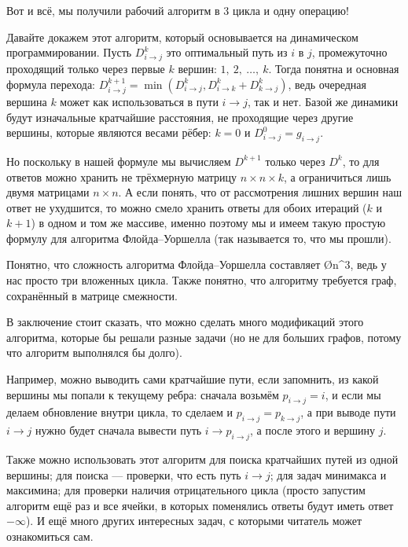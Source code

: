 Вот и всё, мы получили рабочий алгоритм в 3 цикла и одну операцию!

Давайте докажем этот алгоритм, который основывается на динамическом программировании. Пусть $D_{i \to j}^k$ это оптимальный путь из $i$ в $j$, промежуточно проходящий только через первые $k$ вершин: $1,\ 2,\ \ldots,\ k$. Тогда понятна и основная формула перехода: $D_{i \to j}^{k + 1} = \min( D_{i \to j}^k, D_{i \to k}^k + D_{k \to j}^{k})$, ведь очередная вершина $k$ может как использоваться в пути $i \to j$, так и нет. Базой же динамики будут изначальные кратчайшие расстояния, не проходящие через другие вершины, которые являются весами рёбер: $k = 0$ и $D_{i \to j}^0 = g_{i \to j}$.

Но поскольку в нашей формуле мы вычисляем $D^{k + 1}$ только через $D^k$, то для ответов можно хранить не трёхмерную матрицу $n \times n \times k$, а ограничиться лишь двумя матрицами $n \times n$. А если понять, что от рассмотрения лишних вершин наш ответ не ухудшится, то можно смело хранить ответы для обоих итераций ($k$ и $k + 1$) в одном и том же массиве, именно поэтому мы и имеем такую простую формулу для алгоритма Флойда–Уоршелла (так называется то, что мы прошли).

Понятно, что сложность алгоритма Флойда–Уоршелла составляет \O{n^3}, ведь у нас просто три вложенных цикла. Также понятно, что алгоритму требуется граф, сохранённый в матрице смежности.

В заключение стоит сказать, что можно сделать много модификаций этого алгоритма, которые бы решали разные задачи (но не для больших графов, потому что алгоритм выполнялся бы долго).

Например, можно выводить сами кратчайшие пути, если запомнить, из какой вершины мы попали к текущему ребра: сначала возьмём $p_{i \to j} = i$, и если мы делаем обновление внутри цикла, то сделаем и $p_{i \to j} = p_{k \to j}$, а при выводе пути $i \to j$ нужно будет сначала вывести путь $i \to p_{i \to j}$, а после этого и вершину $j$.

Также можно использовать этот алгоритм для поиска кратчайших путей из одной вершины; для поиска  — проверки, что есть путь $i \to j$; для задач минимакса и максимина; для проверки наличия отрицательного цикла (просто запустим алгоритм ещё раз и все ячейки, в которых поменялись ответы будут иметь ответ $-\infty$). И ещё много других интересных задач, с которыми читатель может ознакомиться сам.
